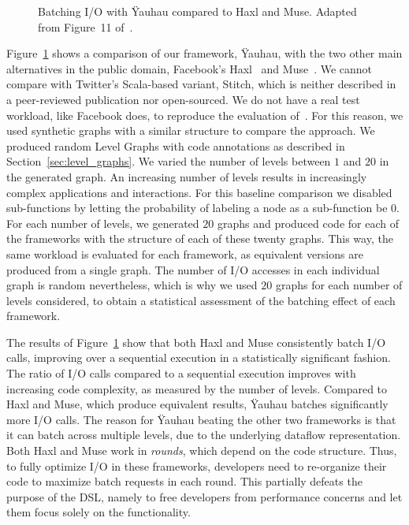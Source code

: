 \begin{figure}[t]
    	\centering
		\caption{Batching \ac{I/O} with \"{Y}auhau compared to Haxl and Muse. Adapted from Figure~11 of~\cite{ertel_cc18}.}	
		\label{fig:yauhau_baseline}
\end{figure}

Figure~\ref{fig:yauhau_baseline} shows a comparison of our framework, \"{Y}auhau, with the two other main alternatives in the public domain, Facebook's Haxl~\cite{marlow2014haxl} and Muse~\cite{muse}.
We cannot compare with Twitter's Scala-based variant, Stitch\cite{stitch}, which is neither described in a peer-reviewed publication nor open-sourced.
We do not have a real test workload, like Facebook does, to reproduce the evaluation of~\cite{marlow2014haxl}.
For this reason, we used synthetic graphs with a similar structure to compare the approach.
We produced random Level Graphs with code annotations as described in Section~\ref{sec:level_graphs}. 
We varied the number of levels between $1$ and $20$ in the generated graph.
An increasing number of levels results in increasingly complex applications and interactions.
For this baseline comparison we disabled sub-functions by letting the probability of labeling a node as a sub-function be $0$.
For each number of levels, we generated $20$ graphs and produced code for each of the frameworks with the structure of each of these twenty graphs.
This way, the same workload is evaluated for each framework, as equivalent versions are produced from a single graph.
The number of \ac{I/O} accesses in each individual graph is random nevertheless, which is why we used $20$ graphs for each number of levels considered, to obtain a statistical assessment of the batching effect of each framework.

The results of Figure~\ref{fig:yauhau_baseline} show that both Haxl and Muse consistently batch \ac{I/O} calls, improving over a sequential execution in a statistically significant fashion.
The ratio of \ac{I/O} calls compared to a sequential execution improves with increasing code complexity, as measured by the number of levels. 
Compared to Haxl and Muse, which produce equivalent results, \"{Y}auhau batches significantly more \ac{I/O} calls.
The reason for \"{Y}auhau beating the other two frameworks is that it can batch across multiple levels, due to the underlying dataflow representation.
Both Haxl and Muse work in \emph{rounds}, which depend on the code structure.
Thus, to fully optimize \ac{I/O} in these frameworks, developers need to re-organize their code to maximize batch requests in each round.
This partially defeats the purpose of the \ac{DSL}, namely to free developers from performance concerns and let them focus solely on the functionality.

